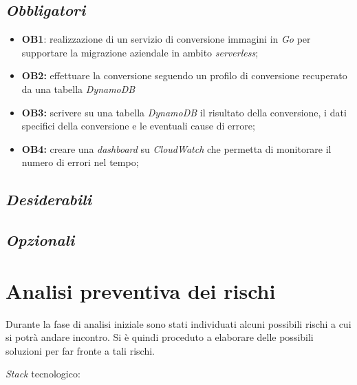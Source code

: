 \subsection*{\emph{Obbligatori}}
\begin{itemize}
    \item \textbf{OB1}: realizzazione di un servizio di conversione immagini
          in \emph{Go} per supportare la migrazione aziendale in ambito
          \emph{\glsfirstoccur\gls{serverless}};
    \item \textbf{OB2:} effettuare la conversione seguendo un profilo di
          conversione recuperato da una tabella \emph{\glsfirstoccur\gls{DynamoDB}}
    \item \textbf{OB3:} scrivere su una tabella \emph{DynamoDB} il risultato
          della conversione, i dati specifici della conversione e le eventuali cause
          di errore;
    \item \textbf{OB4:} creare una \emph{\glsfirstoccur\gls{dashboard}} su
          \emph{\glsfirstoccur\gls{CloudWatch}} che permetta di monitorare il numero
          di errori nel tempo;
\end{itemize}
\subsection*{\emph{Desiderabili}}

\subsection*{\emph{Opzionali}}

\section{Analisi preventiva dei rischi}

Durante la fase di analisi iniziale sono stati individuati alcuni possibili rischi a cui si potrà andare incontro.
Si è quindi proceduto a elaborare delle possibili soluzioni per far fronte a tali rischi.\\

\begin{risk}{\emph{Stack} tecnologico:}
    \label{risk:stack-tecnologico}
\end{risk}

